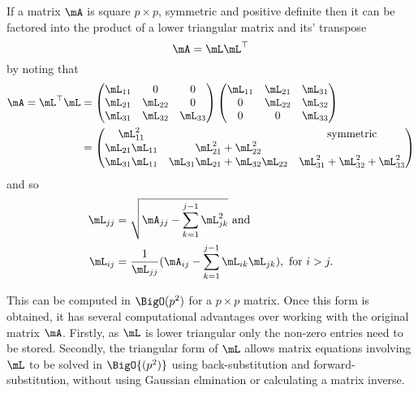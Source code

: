 If a matrix $\mA$ is square $p \times p$, symmetric and positive definite then it can be factored into the
product of a lower triangular matrix and its' transpose
\[
	\mA = \mL \mL^\top
\]
by noting that
\begin{align*}
	\mA = \mL^\top \mL &= \begin{pmatrix}
	\mL_{11}          & 0                                     & 0                                    \\
	\mL_{21}          & \mL_{22}                              & 0                                    \\
	\mL_{31}          & \mL_{32}                              & \mL_{33}                             
	\end{pmatrix}
	\begin{pmatrix}
	\mL_{11}          & \mL_{21}                              & \mL_{31}                             \\
	0                 & \mL_{22}                              & \mL_{32}                             \\
	0                 & 0                                     & \mL_{33}                             
	\end{pmatrix}	\\
	&= \begin{pmatrix}
	\mL_{11}^2        &                                       & \text{symmetric}                     \\
	\mL_{21} \mL_{11} & \mL_{21}^2 + \mL_{22}^2               &                                      \\
	\mL_{31} \mL_{11} & \mL_{31} \mL_{21} + \mL_{32} \mL_{22} & \mL_{31}^2 + \mL_{32}^2 + \mL_{33}^2 
	\end{pmatrix}
\end{align*}
and so
\begin{align*}
	\mL_{jj} & = \sqrt{\mA_{jj} - \sum_{k=1}^{j-1} \mL_{jk}^2} \text{ and}                               \\
	\mL_{ij} & = \frac{1}{\mL_{jj}} (\mA_{ij} - \sum_{k=1}^{j-1} \mL_{ik} \mL_{jk}), \text{ for } i > j. 
\end{align*}

This can be computed in $\BigO(p^2)$ for a $p \times p$ matrix. Once this form is obtained, it has several
computational advantages over working with the original matrix $\mA$. Firstly, as $\mL$ is lower triangular
only the non-zero entries need to be stored. Secondly, the triangular form of $\mL$ allows matrix equations
involving $\mL$ to be solved in $\BigO{(p^2)}$ using back-substitution and forward-substitution, without using
Gaussian elmination or calculating a matrix inverse.

